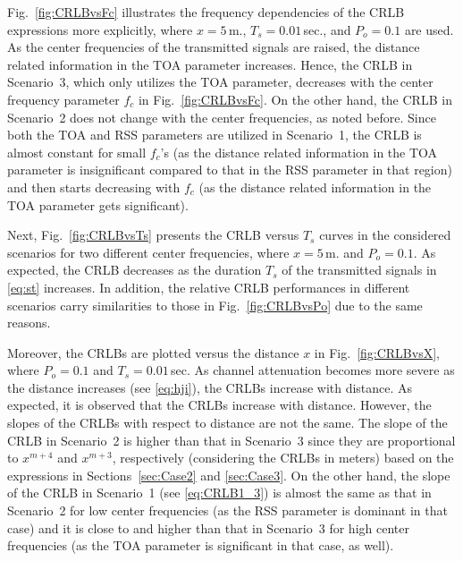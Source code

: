 \documentclass[10pt,twocolumn]{IEEEtran}
\begin{document}
Fig.~\ref{fig:CRLBvsFc} illustrates the frequency dependencies of the CRLB expressions more explicitly, where $x = 5$\,m., $T_s = 0.01\,$sec., and $P_o=0.1$ are used. As the center frequencies of the transmitted signals are raised, the distance related information in the TOA parameter increases. Hence, the CRLB in Scenario~3, which only utilizes the TOA parameter, decreases with the center frequency parameter $f_c$ in Fig.~\ref{fig:CRLBvsFc}. On the other hand, the CRLB in Scenario~2 does not change with the center frequencies, as noted before. Since both the TOA and RSS parameters are utilized in Scenario~1, the CRLB is almost constant for small $f_c$'s (as the distance related information in the TOA parameter is insignificant compared to that in the RSS parameter in that region) and then starts decreasing with $f_c$ (as the distance related information in the TOA parameter gets significant).

Next, Fig.~\ref{fig:CRLBvsTs} presents the CRLB versus $T_s$ curves in the considered scenarios for two different center frequencies, where $x = 5$\,m. and $P_o=0.1$. As expected, the CRLB decreases as the duration $T_s$ of the transmitted signals in \eqref{eq:st} increases. In addition, the relative CRLB performances in different scenarios carry similarities to those in Fig.~\ref{fig:CRLBvsPo} due to the same reasons.

Moreover, the CRLBs are plotted versus the distance $x$ in Fig.~\ref{fig:CRLBvsX}, where $P_o=0.1$ and $T_s = 0.01\,$sec. As channel attenuation becomes more severe as the distance increases (see \eqref{eq:hji}), the CRLBs increase with distance. As expected, it is observed that the CRLBs increase with distance. However, the slopes of the CRLBs with respect to distance are not the same. The slope of the CRLB in Scenario~2 is higher than that in Scenario~3 since they are proportional to $x^{m+4}$ and $x^{m+3}$, respectively (considering the CRLBs in meters) based on the expressions in Sections~\ref{sec:Case2} and \ref{sec:Case3}. On the other hand, the slope of the CRLB in Scenario~1 (see \eqref{eq:CRLB1_3}) is almost the same as that in Scenario~2 for low center frequencies (as the RSS parameter is dominant in that case) and it is close to and higher than that in Scenario~3 for high center frequencies (as the TOA parameter is significant in that case, as well).
\end{document}
